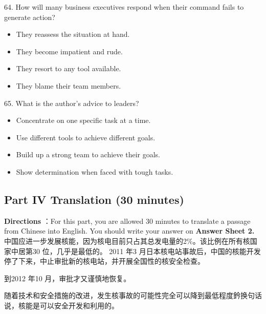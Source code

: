 \documentclass[UTF8,11pt]{ctexart}
\begin{document}
64. How will many business executives respond when their command fails to generate action?


\begin{itemize}[leftmargin=2em,itemsep=.2em,topsep=.4em]\item[A.] They reassess the situation at hand.
\item[B.] They become impatient and rude.
\item[C.] They resort to any tool available.
\item[D.] They blame their team members.
\end{itemize}

65. What is the author’s advice to leaders?


\begin{itemize}[leftmargin=2em,itemsep=.2em,topsep=.4em]\item[A.] Concentrate on one specific task at a time.
\item[B.] Use different tools to achieve different goals.
\item[C.] Build up a strong team to achieve their goals.
\item[D.] Show determination when faced with tough tasks.
\end{itemize}

\subsection*{\textbf{Part IV} \textbf{Translation} \textbf{(30 minutes)}}


\textbf{Directions} ：For this part, you are allowed 30 minutes to translate a passage from Chinese into English. You should write your answer on\textbf{ Answer Sheet 2.} 中国应进一步发展核能，因为核电目前只占其总发电量的2\%。该比例在所有核国家中居第30 位，几乎是最低的。 2011 年3 月日本核电站事故后，中国的核能开发停了下来，中止审批新的核电站，并开展全国性的核安全检查。


到2012 年10 月，审批才又谨慎地恢复。


随着技术和安全措施的改进，发生核事故的可能性完全可以降到最低程度鈐换句话说，核能是可以安全开发和利用的。
\end{document}
